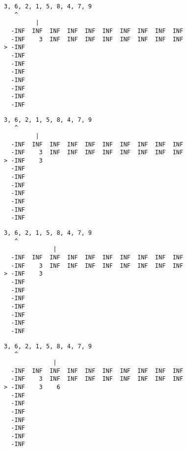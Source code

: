 { \begin{verbatim}
3, 6, 2, 1, 5, 8, 4, 7, 9
   ^
         |
  -INF  INF  INF  INF  INF  INF  INF  INF  INF  INF
  -INF    3  INF  INF  INF  INF  INF  INF  INF  INF
> -INF                                             
  -INF                                             
  -INF                                             
  -INF                                             
  -INF                                             
  -INF                                             
  -INF                                             
  -INF                                             
\end{verbatim} }

{ \begin{verbatim}
3, 6, 2, 1, 5, 8, 4, 7, 9
   ^
         |
  -INF  INF  INF  INF  INF  INF  INF  INF  INF  INF
  -INF    3  INF  INF  INF  INF  INF  INF  INF  INF
> -INF    3                                        
  -INF                                             
  -INF                                             
  -INF                                             
  -INF                                             
  -INF                                             
  -INF                                             
  -INF                                             
\end{verbatim} }

{ \begin{verbatim}
3, 6, 2, 1, 5, 8, 4, 7, 9
   ^
              |
  -INF  INF  INF  INF  INF  INF  INF  INF  INF  INF
  -INF    3  INF  INF  INF  INF  INF  INF  INF  INF
> -INF    3                                        
  -INF                                             
  -INF                                             
  -INF                                             
  -INF                                             
  -INF                                             
  -INF                                             
  -INF                                             
\end{verbatim} }

{ \begin{verbatim}
3, 6, 2, 1, 5, 8, 4, 7, 9
   ^
              |
  -INF  INF  INF  INF  INF  INF  INF  INF  INF  INF
  -INF    3  INF  INF  INF  INF  INF  INF  INF  INF
> -INF    3    6                                   
  -INF                                             
  -INF                                             
  -INF                                             
  -INF                                             
  -INF                                             
  -INF                                             
  -INF                                             
\end{verbatim} }

